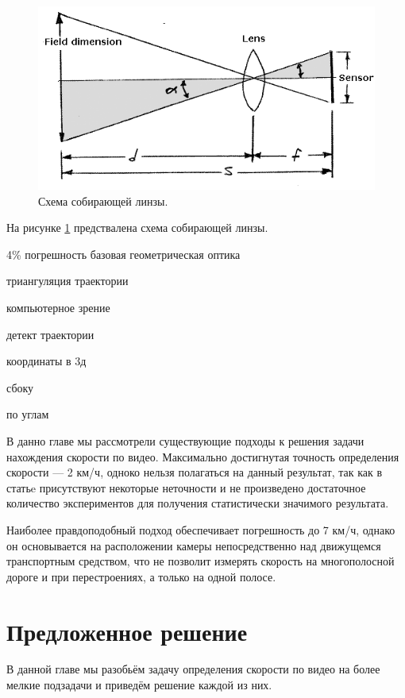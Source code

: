 \documentclass[specification,annotation,times]{itmo-student-thesis}
\begin{document}
\begin{figure}[!ht]
	\caption{Схема собирающей линзы.}\label{img:optic}
	\includegraphics[width=0.85\linewidth]{../png/optic.png}
	\centering
\end{figure} 

На рисунке \ref{img:optic} предствалена схема собирающей линзы.

4\% погрешность \cite{5228496} базовая геометрическая оптика

триангуляция  траектории\cite{845377}

компьютерное зрение \cite{Gawande20}

детект траектории \cite{surveillance}

координаты в 3д \cite{inproceedings}

сбоку \cite{8124468}

по углам \cite{6754885}

\finishrelatedwork

\chapterconclusion
В данно главе мы рассмотрели существующие подходы к решения задачи нахождения скорости по видео. Максимально достигнутая точность определения скорости --- 2 км/ч, одноко нельзя полагаться на данный результат, так как в статьe \cite{key} присутствуют некоторые неточности и не произведено достаточное количество экспериментов для получения статистически значимого результата. 

Наиболее правдоподобный подход обеспечивает погрешность до 7 км/ч, однако он основывается на расположении камеры непосредственно над движущемся транспортным средством, что не позволит измерять скорость на многополосной дороге и при перестроениях, а только на одной полосе.

\chapter{Предложенное решение}
В данной главе мы разобьём задачу определения скорости по видео на более мелкие подзадачи и  приведём решение каждой из них. 
\end{document}

